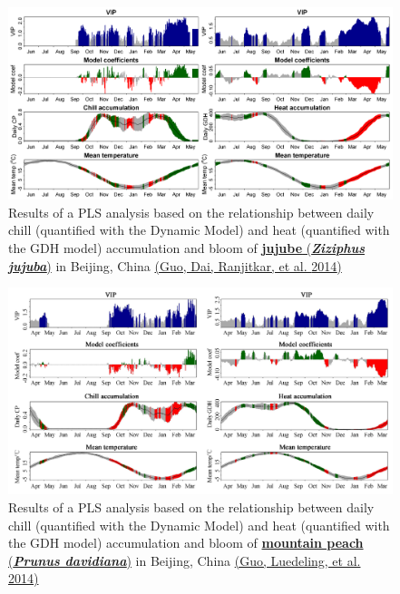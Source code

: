 \documentclass[
]{book}
\begin{document}
\begin{figure}
\centering
\includegraphics{pictures/PLS_chill_force_jujube.png}
\caption{Results of a PLS analysis based on the relationship between daily chill (quantified with the Dynamic Model) and heat (quantified with the GDH model) accumulation and bloom of \href{https://en.wikipedia.org/wiki/Jujube}{\textbf{jujube} (\textbf{\emph{Ziziphus jujuba}})} in Beijing, China \href{https://link.springer.com/article/10.1007/s00484-013-0714-3}{(Guo, Dai, Ranjitkar, et al. \protect\hyperlink{ref-guo2014chilling}{2014})}}
\end{figure}

\begin{figure}
\centering
\includegraphics{pictures/PLS_chill_force_mountain_peach_Beijing.png}
\caption{Results of a PLS analysis based on the relationship between daily chill (quantified with the Dynamic Model) and heat (quantified with the GDH model) accumulation and bloom of \href{https://en.wikipedia.org/wiki/Prunus_davidiana}{\textbf{mountain peach} (\textbf{\emph{Prunus davidiana}})} in Beijing, China \href{https://journal.kib.ac.cn/EN/volumn/volumn_1319.shtml\#1}{(Guo, Luedeling, et al. \protect\hyperlink{ref-guo2014differences}{2014})}}
\end{figure}
\end{document}
